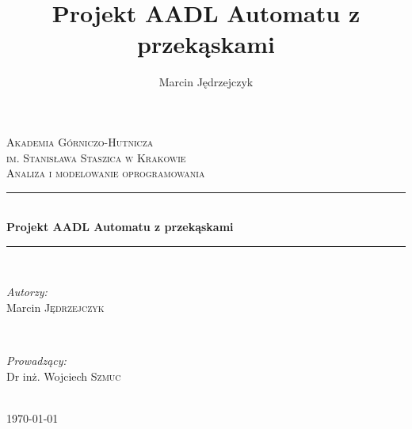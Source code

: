 \documentclass[a4paper, 11pt]{article}
\author{Marcin Jędrzejczyk  }
\title{Projekt AADL Automatu z przekąskami }
\newcommand{\HRule}{\rule{\linewidth}{0.5mm}} %
\begin{document}
\begin{titlepage}


\center %

\textsc{\LARGE Akademia Górniczo-Hutnicza    \\im. Stanisława Staszica w Krakowie}\\[1.5cm] %
\textsc{\Large Analiza i modelowanie oprogramowania}\\[0.5cm] %


\HRule \\[0.4cm]
{ \huge \bfseries Projekt AADL Automatu z przekąskami}\\[0.4cm] %
\HRule \\[5.5cm]
 

\begin{minipage}{0.4\textwidth}
\begin{flushleft} \large 
\emph{Autorzy:}\\
Marcin \textsc{Jędrzejczyk} \\


\end{flushleft}
\end{minipage}
~
\begin{minipage}{0.4\textwidth}
\begin{flushright} \large
\emph{Prowadzący:}\\
 Dr inż. Wojciech \textsc{Szmuc} %
\end{flushright}
\end{minipage} \\[5cm]

{\large \today}\\[3cm]
\vfill
\end{titlepage}
\newpage
\end{document}
